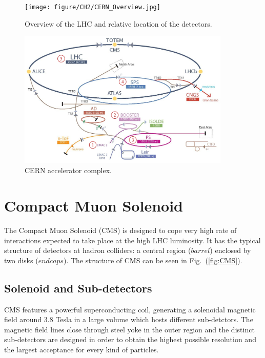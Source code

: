 \begin{figure}[hbtp]
  \begin{center}
    \texttt{[image: figure/CH2/CERN\_Overview.jpg]}
  \end{center}
  \caption{\label{fig:LHC_overview}Overview of the LHC and relative location of the detectors.}
\end{figure}

\begin{figure}[hbtp]
  \begin{center}
    \includegraphics[width=0.9\textwidth]{figure/CH2/complex.png}
  \end{center}
  \caption{\label{fig:accelerator}CERN accelerator complex.}
\end{figure}

\section{Compact Muon Solenoid}
The Compact Muon Solenoid (CMS) is designed to cope very high rate of interactions expected to take place at the high LHC luminosity. It has the typical structure of detectors at hadron colliders: a central region ($barrel$) enclosed by two disks ($endcaps$). The structure of CMS can be seen in Fig.~(\ref{fig:CMS}).

\subsection*{Solenoid and Sub-detectors}
CMS features a powerful superconducting coil, generating a solenoidal magnetic field around 3.8 Tesla in a large volume which hosts different sub-detctors. The magnetic field lines close through steel yoke in the outer region and the distinct sub-detectors are designed in order to obtain the highest possible resolution and the largest acceptance for every kind of particles.

